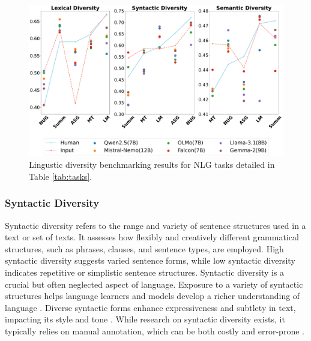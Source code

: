 \documentclass[11pt,a4paper]{article}
\begin{document}

\begin{figure}[ht]
    \centering
    \includegraphics[scale=0.22]{figures/benchmark.pdf}
    \caption{Lingustic diversity benchmarking results for NLG tasks detailed in Table \ref{tab:tasks}.}
    \label{fig:benchmark}
\end{figure}



\subsubsection{Syntactic Diversity}
\label{sec:syn}
Syntactic diversity refers to the range and variety of sentence structures used in a text or set of texts. It assesses how flexibly and creatively different grammatical structures, such as phrases, clauses, and sentence types, are employed. High syntactic diversity suggests varied sentence forms, while low syntactic diversity indicates repetitive or simplistic sentence structures.
Syntactic diversity is a crucial but often neglected aspect of language. Exposure to a variety of syntactic structures helps language learners and models develop a richer understanding of language \citep{aggarwal-etal-2022-towards}. Diverse syntactic forms enhance expressiveness and subtlety in text, impacting its style and tone \citep{edwards1998diversity}. While research on syntactic diversity exists, it typically relies on manual annotation, which can be both costly and error-prone \citep{a89efe5d-217a-3260-b2b1-1437ae204234}.
\end{document}
